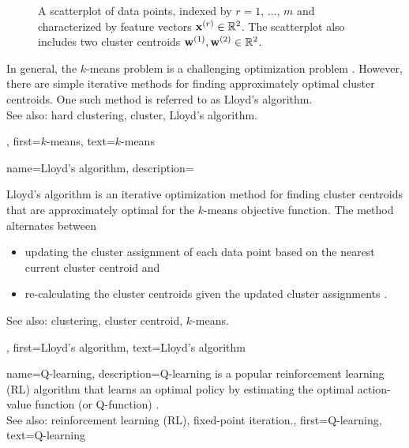 {{{\begin{figure}[H]
\begin{center}
		\end{center}
		\caption{A scatterplot of data points, indexed by $r=1,\,\ldots,\,m$ and 
			characterized by feature vectors ${\bf x}^{(r)} \in \mathbb{R}^{2}$. 
			The scatterplot also includes two cluster centroids ${{\bf w}}^{(1)}, {{\bf w}}^{(2)} \in \mathbb{R}^{2}$. \label{fig_kmeans_dict}}
		\end{figure} 
		In general, the $k$-means problem is a challenging optimization problem \cite{Mahajan2009Springer}. 
		However, there are simple iterative methods for finding approximately optimal 
		cluster centroids. One such method is referred to as Lloyd's algorithm.\\
		See also: hard clustering, cluster, Lloyd's algorithm.},
	first={$k$-means},
	text={$k$-means} 
}

{name={Lloyd's algorithm}, 
	description={Lloyd's algorithm is an iterative 
	   optimization method for finding cluster centroids that are approximately 
	   optimal for the $k$-means objective function. The method 
	   alternates between
	   \begin{itemize} 
			\item updating the cluster assignment of each data point 
			      based on the nearest current cluster centroid and 
			\item re-calculating the cluster centroids given the updated 
			      cluster assignments \cite{Lloyd1982}.
		\end{itemize}
		See also: clustering, cluster centroid, $k$-means.},
	first={Lloyd's algorithm},
	text={Lloyd's algorithm} 
}

{name={Q-learning}, 
	description={Q-learning is a popular reinforcement learning (RL) 
	     algorithm that learns an optimal policy by estimating the optimal action-value 
		function (or Q-function) \cite{SuttonEd2}.  \\
		See also: reinforcement learning (RL), fixed-point iteration.},
	first={Q-learning},
	text={Q-learning} 
}

}
